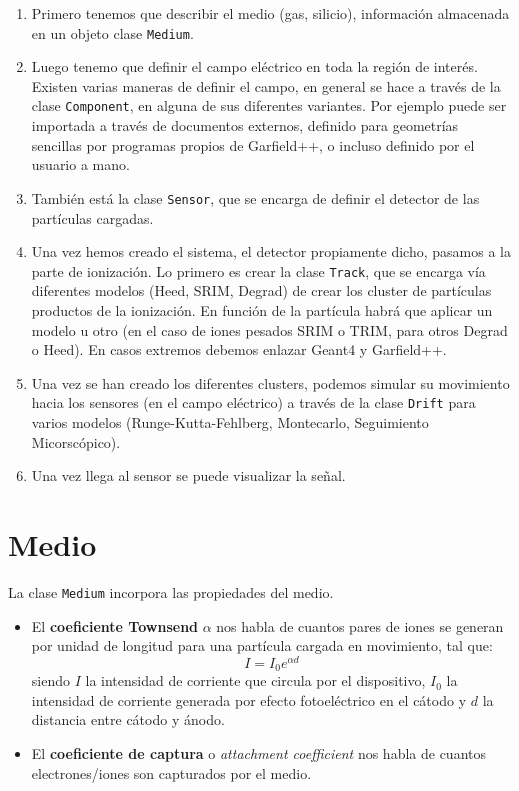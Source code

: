 \begin{enumerate}
    \item Primero tenemos que describir el medio (gas, silicio), información almacenada en un objeto clase \texttt{Medium}.
    \item Luego tenemo que definir el campo eléctrico en toda la región de interés. Existen varias maneras de definir el campo, en general se hace a través de la clase \texttt{Component}, en alguna de sus diferentes variantes. Por ejemplo puede ser importada a través de documentos externos, definido para geometrías sencillas por programas propios de Garfield++, o incluso definido por el usuario a mano. 
    \item También está la clase \texttt{Sensor}, que se encarga de definir el detector de las partículas cargadas. 
    \item Una vez hemos creado el sistema, el detector propiamente dicho, pasamos a la parte de ionización. Lo primero es crear la clase \texttt{Track}, que se encarga vía diferentes modelos (Heed, SRIM, Degrad) de crear los cluster de partículas productos de la ionización. En función de la partícula habrá que aplicar un modelo u otro (en el caso de iones pesados SRIM o TRIM, para otros Degrad o Heed). En casos extremos debemos enlazar Geant4 y Garfield++.
    \item Una vez se han creado los diferentes clusters, podemos simular su movimiento hacia los sensores (en el campo eléctrico) a través de la clase \texttt{Drift} para varios modelos (Runge-Kutta-Fehlberg, Montecarlo, Seguimiento Micorscópico). 
    \item Una vez llega al sensor se puede visualizar la señal. 
\end{enumerate}




\section{Medio}

La clase \texttt{Medium} incorpora las propiedades del medio. 

\begin{itemize}
    \item El \textbf{coeficiente Townsend} $\alpha$ nos habla de cuantos pares de iones se generan por unidad de longitud para una partícula cargada en movimiento, tal que:
    \begin{equation}
        I = I_0 e^{\alpha d}
    \end{equation}
    siendo $I$ la intensidad de corriente que circula por el dispositivo, $I_0$ la intensidad de corriente generada por efecto fotoeléctrico en el cátodo y $d$ la distancia entre cátodo y ánodo.
    \item El \textbf{coeficiente de captura} o \textit{attachment coefficient} nos habla de cuantos electrones/iones son capturados por el medio.
\end{itemize}

